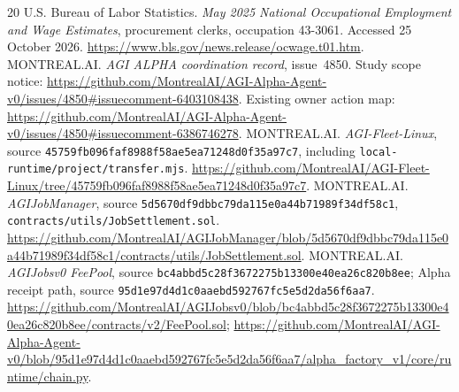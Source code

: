 \documentclass[11pt,letterpaper]{article}
\newcommand{\code}[1]{\texttt{\small #1}}
\begin{document}
\begin{thebibliography}{20}
 U.S. Bureau of Labor Statistics. \emph{May 2025 National Occupational Employment and Wage Estimates}, procurement clerks, occupation 43-3061. Accessed 25 October 2026. \url{https://www.bls.gov/news.release/ocwage.t01.htm}.
 MONTREAL.AI. \emph{AGI ALPHA coordination record}, issue~4850. Study scope notice: \url{https://github.com/MontrealAI/AGI-Alpha-Agent-v0/issues/4850#issuecomment-6403108438}. Existing owner action map: \url{https://github.com/MontrealAI/AGI-Alpha-Agent-v0/issues/4850#issuecomment-6386746278}.
 MONTREAL.AI. \emph{AGI-Fleet-Linux}, source \code{45759fb096faf8988f58ae5ea71248d0f35a97c7}, including \code{local-runtime/project/transfer.mjs}. \url{https://github.com/MontrealAI/AGI-Fleet-Linux/tree/45759fb096faf8988f58ae5ea71248d0f35a97c7}.
 MONTREAL.AI. \emph{AGIJobManager}, source \code{5d5670df9dbbc79da115e0a44b71989f34df58c1}, \code{contracts/utils/JobSettlement.sol}. \url{https://github.com/MontrealAI/AGIJobManager/blob/5d5670df9dbbc79da115e0a44b71989f34df58c1/contracts/utils/JobSettlement.sol}.
 MONTREAL.AI. \emph{AGIJobsv0 FeePool}, source \code{bc4abbd5c28f3672275b13300e40ea26c820b8ee}; Alpha receipt path, source \code{95d1e97d4d1c0aaebd592767fc5e5d2da56f6aa7}. \url{https://github.com/MontrealAI/AGIJobsv0/blob/bc4abbd5c28f3672275b13300e40ea26c820b8ee/contracts/v2/FeePool.sol}; \url{https://github.com/MontrealAI/AGI-Alpha-Agent-v0/blob/95d1e97d4d1c0aaebd592767fc5e5d2da56f6aa7/alpha_factory_v1/core/runtime/chain.py}.
\end{thebibliography}
\end{document}
